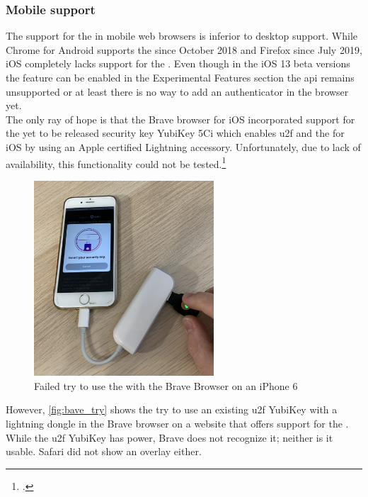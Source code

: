 \subsubsection{Mobile support}

The support for the \wa{} in mobile web browsers is inferior to desktop support. While Chrome for Android supports the \wa{} since October 2018 and Firefox since July 2019, iOS completely lacks support for the \wa. Even though in the iOS 13 beta versions the feature can be enabled in the \frqq Experimental Features\flqq{} section the \gls{api} remains unsupported or at least there is no way to add an authenticator in the browser yet.\\
The only ray of hope is that the Brave browser for iOS incorporated support for the yet to be released security key \frqq YubiKey 5Ci\flqq{} which enables \gls{u2f} and the \wa{} for iOS by using an Apple certified Lightning accessory. Unfortunately, due to lack of availability, this functionality could not be tested.\footcites[See][]{brave-ios}[See][]{brave-now-available}
\\

\begin{figure}[hbt]
	\centering
	\includegraphics[width=0.6\textwidth]{pics/brave_try_dongle.eps}
	\caption[Failed try to use the \wa{} with the Brave Browser on an iPhone 6]{Failed try to use the \wa{} with the Brave Browser on an iPhone 6\footnotemark}
	\label{fig:bave_try}
\end{figure}

However, \autoref{fig:bave_try} shows the try to use an existing \gls{u2f} YubiKey with a lightning dongle in the Brave browser on a website that offers support for the \wa. While the \gls{u2f} YubiKey has power, Brave does not recognize it; neither is it usable. Safari did not show an overlay either.

